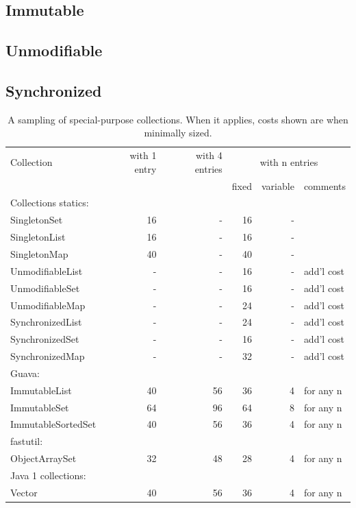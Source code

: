 \subsection{Immutable}
\label{sec:immutable-collections}

\subsection{Unmodifiable}
\label{sec:unmodifiable-collections}

\subsection{Synchronized}
\label{sec:synchronized-collections}

\begin{table}
\centering
 		\begin{tabular}{l||r||r||rrl}
 		\toprule
	 	 Collection & with 1 entry & with 4 entries &
	 	 \multicolumn{3}{c}{with n entries}\\
	 	 & & & fixed & variable & comments \\
	 	 \midrule
	 	\multicolumn{5}{l}{Collections statics:} \\
	 	\midrule
	 	SingletonSet &  16 & - & 16 & - &  \\
	 	SingletonList & 16 & - & 16 & - &  \\
	 	SingletonMap &  40 & - & 40 & - &  \\
	 	\midrule
	 	UnmodifiableList & - & - & 16 & - & add'l cost \\
	 	UnmodifiableSet & - & - & 16 & - & add'l cost \\
	 	UnmodifiableMap & - & - & 24 & - & add'l cost \\
	 	\midrule
	 	SynchronizedList & - & - & 24  & - & add'l cost \\	 	
	 	SynchronizedSet & - & - & 16  & - & add'l cost \\	 	
	 	SynchronizedMap & - & - & 32  & - & add'l cost \\	 	
	 	\midrule
	 	\multicolumn{5}{l}{Guava:} \\
	 	\midrule
	 	ImmutableList & 40 & 56 & 36 \footnotemark[1] & 4 & for any n \\
	 	ImmutableSet & 64 & 96 & 64 \footnotemark[2] & 8 & for any n \\
	 	ImmutableSortedSet & 40 & 56 & 36 \footnotemark[1] & 4 & for any n \\
	 	 \midrule
	 	\multicolumn{5}{l}{fastutil:} \\
	 	\midrule
	 	ObjectArraySet & 32 & 48 & 28 \footnotemark[1] & 4
	 	& for any n \\
	 	\midrule
	 	\multicolumn{5}{l}{Java 1 collections:} \\
	 	\midrule
	 	Vector & 40 & 56 & 36 \footnotemark[1]  & 4 & for any n\\ 	
	 	\bottomrule
	 	\end{tabular}
	 	
	\caption{A sampling of special-purpose collections. When it applies, costs
	shown are when minimally sized.}
	\label{tab:specialized-collections-small}
\end{table}

